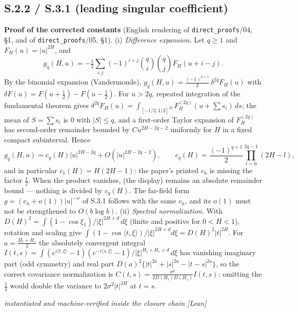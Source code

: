 \documentclass[11pt]{article}
\theoremstyle{definition}
\theoremstyle{remark}
\newcommand{\statustag}[1]{%
  \par\nobreak\begingroup\footnotesize\itshape\raggedleft #1\par\endgroup}
\newcommand{\Wlean}{[Lean]}
\begin{document}
\subsection{S.2.2 / S.3.1 (leading singular coefficient)}
\textbf{Proof of the corrected constants} (English rendering of
\texttt{direct\_\allowbreak{}proofs}/\allowbreak{}04, \S1, and of
\texttt{direct\_\allowbreak{}proofs}/\allowbreak{}05, \S1).
(i) \emph{Difference expansion.} Let $q\ge1$ and $F_H(u)=|u|^{2H}$, and
\[
g_q(H,u)=-\tfrac12\sum_{i,j}(-1)^{i+j}\binom qi\binom qj
F_H(u+i-j).
\]
By the binomial expansion (Vandermonde),
$g_q(H,u)=\tfrac{(-1)^{q+1}}2\,\delta^{2q}F_H(u)$ with
$\delta F(u)=F(u+\tfrac12)-F(u-\tfrac12)$. For $u>2q$, repeated integration
of the fundamental theorem gives
$\delta^{2q}F_H(u)=\int_{[-1/2,1/2]^{2q}}F_H^{(2q)}(u+\textstyle\sum s_i)\,ds$;
the mean of $S=\sum s_i$ is $0$ with $|S|\le q$, and a first-order Taylor
expansion of $F_H^{(2q)}$ has second-order remainder bounded by
$Cu^{2H-2q-2}$ uniformly for $H$ in a fixed compact subinterval. Hence
\[
g_q(H,u)=c_q(H)|u|^{2H-2q}+O(|u|^{2H-2q-2}),
\qquad
c_q(H)=\frac{(-1)^{q+1}}{2}\prod_{l=0}^{2q-1}(2H-l),
\]
and in particular $c_1(H)=H(2H-1)$: the paper's printed $c_h$ is missing
the factor $\tfrac12$. When the product vanishes, (the display) remains an
absolute remainder bound --- nothing is divided by $c_q(H)$. The far-field
form $g=(c_h+o(1))|u|^{-\psi}$ of S.3.1 follows with the same $c_h$, and
its $o(1)$ must not be strengthened to $O(b\log b)$.
(ii) \emph{Spectral normalization.} With
$D(H)^2=\int(1-\cos\xi_1)/|\xi|^{2H+d}\,d\xi$ (finite and positive for
$0<H<1$), rotation and scaling give
$\int(1-\cos\langle t,\xi\rangle)/|\xi|^{2H+d}d\xi=D(H)^2|t|^{2H}$. For
$a=\frac{H_t+H_s}{2}$ the absolutely convergent integral
$I(t,s)=\int(e^{i\langle t,\xi\rangle}-1)(e^{-i\langle s,\xi\rangle}-1)
/|\xi|^{H_t+H_s+d}\,d\xi$ has vanishing imaginary part (odd symmetry) and
real part $D(a)^2\{|t|^{2a}+|s|^{2a}-|t-s|^{2a}\}$, so the correct
covariance normalization is
$C(t,s)=\frac{\sigma^2}{2D(H_t)D(H_s)}I(t,s)$: omitting the $\tfrac12$
would double the variance to $2\sigma^2|t|^{2H}$ at $t=s$.
\statustag{instantiated and machine-verified inside the closure chain \Wlean}

\smallskip{}
\end{document}
